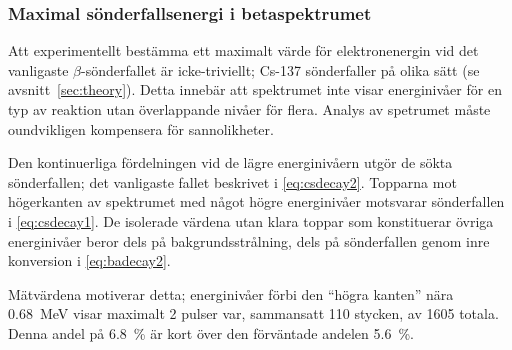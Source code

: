 \subsubsection{Maximal sönderfallsenergi i betaspektrumet} \label{sec:betamax}

Att experimentellt bestämma ett maximalt värde för elektronenergin vid
det vanligaste $\beta$-sönderfallet är icke-triviellt; Cs-137 sönderfaller på
olika sätt (se avsnitt~\ref{sec:theory}). Detta innebär att spektrumet inte
visar energinivåer för en typ av reaktion utan överlappande nivåer för flera.
Analys av spetrumet måste oundvikligen kompensera för sannolikheter.

Den kontinuerliga fördelningen vid de lägre energinivåern utgör de sökta
sönderfallen; det vanligaste fallet beskrivet i \eqref{eq:csdecay2}.
Topparna mot högerkanten av spektrumet med något högre energinivåer motsvarar
sönderfallen i \eqref{eq:csdecay1}. De isolerade värdena utan klara
toppar som konstituerar övriga energinivåer beror dels på
bakgrundsstrålning, dels på sönderfallen genom inre konversion i
\eqref{eq:badecay2}.

Mätvärdena motiverar detta; energinivåer förbi den ``högra kanten'' nära
\qty{0.68}{\MeV} visar maximalt \num{2} pulser var, sammansatt \num{110}
stycken, av \num{1605} totala. Denna andel på \qty{6.8}{\percent} är kort
över den förväntade andelen \qty{5.6}{\percent}.


